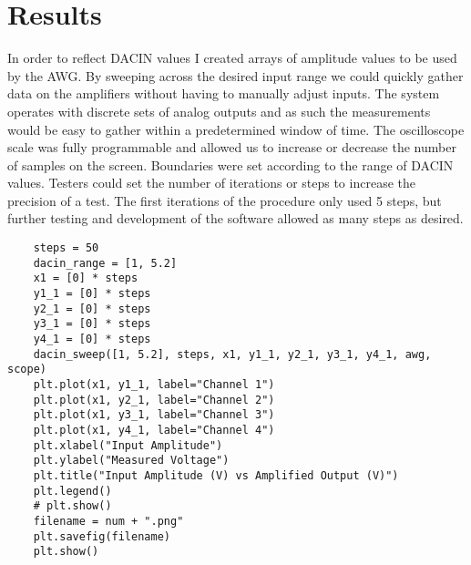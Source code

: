 \section{Results}
\FloatBarrier
In order to reflect DACIN values I created arrays of amplitude values to be used by the AWG. By sweeping across the desired input range we could quickly gather data on the amplifiers without having to manually adjust inputs. The system operates with discrete sets of analog outputs and as such the measurements would be easy to gather within a predetermined window of time. The oscilloscope scale was fully programmable and allowed us to increase or decrease the number of samples on the screen. Boundaries were set according to the range of DACIN values. Testers could set the number of iterations or steps to increase the precision of a test. The first iterations of the procedure only used 5 steps, but further testing and development of the software allowed as many steps as desired.
\FloatBarrier
\begin{lstlisting}
	steps = 50
	dacin_range = [1, 5.2]
	x1 = [0] * steps
	y1_1 = [0] * steps
	y2_1 = [0] * steps
	y3_1 = [0] * steps
	y4_1 = [0] * steps
	dacin_sweep([1, 5.2], steps, x1, y1_1, y2_1, y3_1, y4_1, awg, scope)
	plt.plot(x1, y1_1, label="Channel 1")
	plt.plot(x1, y2_1, label="Channel 2")
	plt.plot(x1, y3_1, label="Channel 3")
	plt.plot(x1, y4_1, label="Channel 4")
	plt.xlabel("Input Amplitude")
	plt.ylabel("Measured Voltage")
	plt.title("Input Amplitude (V) vs Amplified Output (V)")
	plt.legend()
	# plt.show()
	filename = num + ".png"
	plt.savefig(filename)
	plt.show()
\end{lstlisting}

